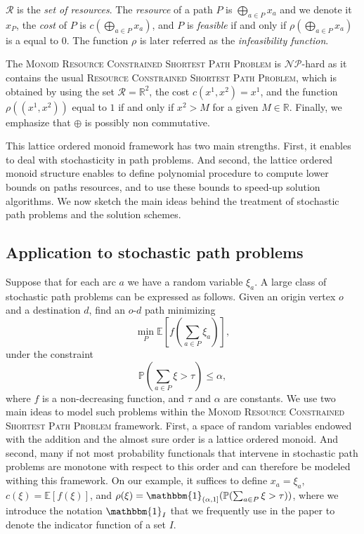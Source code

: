\documentclass[11pt]{amsart}
\theoremstyle{plain}
\theoremstyle{remark}
\def\P{\mathbb{P}}
\def\E{\mathbb{E}}
\newcommand{\ind}{\mathbbm{1}}
\newcommand{\RCSP}{\textsc{Resource Constrained Shortest Path Problem}\xspace}
\newcommand{\MRCSP}{\textsc{Monoid Resource Constrained Shortest Path Problem}\xspace}
\newcommand{\rplus}{\oplus}
\newcommand{\bigrplus}{\bigoplus}
\newcommand{\rset}{\mathcal{R}}
\newcommand{\rcost}{c}
\newcommand{\rmeas}{\rho}
\newcommand{\re}{x}
\newcommand{\NP}{$\mathcal{NP}$}
\begin{document}
$\rset$ is the \emph{set of resources}. The \emph{resource} of a path $P$ is $\bigrplus_{a \in P}x_{a}$ and we denote it $\re_{P}$, the \emph{cost} of $P$ is $\rcost\left(\bigrplus_{a \in P}x_{a}\right)$, and $P$ is \emph{feasible} if and only if $\rmeas\left(\bigrplus_{a \in P}x_{a}\right)$ is a equal to $0$. The function $\rmeas$ is later referred as the \emph{infeasibility function}. 

The \MRCSP is \NP-hard as it contains the usual \RCSP, which is obtained by using the set $\rset = \mathbb{R}^{2}$, the cost $\rcost(x^{1},x^{2}) = x^{1}$, and the function $\rmeas((x^{1},x^{2}))$ equal to $1$ if and only if $x^{2}>M$ for a given $M\in \mathbb{R}$. Finally, we emphasize that $\rplus$ is possibly non commutative. 

This lattice ordered monoid framework has two main strengths. First, it enables to deal with stochasticity in path problems. And second, the lattice ordered monoid structure enables to define polynomial procedure to compute lower bounds on paths resources, and to use these bounds to speed-up solution algorithms. We now sketch the main ideas behind the treatment of stochastic path problems and the solution schemes.



\subsection{Application to stochastic path problems} \label{sub:application_to_stochastic_path_problem}

Suppose that for each arc $a$ we have a random variable $\xi_{a}$. A large class of stochastic path problems can be expressed as follows. Given an origin vertex $o$ and a destination $d$, find an $o$-$d$ path minimizing
$$\min_{P} \E\left[f\left(\sum_{a\in P}\xi_{a}\right)\right],$$
\noindent under the constraint
$$\P\left(\sum_{a\in P}\xi > \tau\right) \leq \alpha, $$
\noindent where $f$ is a non-decreasing function, and $\tau$ and $\alpha$ are constants. We use two main ideas to model such problems within the \MRCSP framework. First, a space of random variables endowed with the addition and the almost sure order is a lattice ordered monoid. And second, many if not most probability functionals that intervene in stochastic path problems are monotone with respect to this order and can therefore be modeled withing this framework. On our example, it suffices to define $\re_{a} = \xi_{a}$, $\rcost(\xi) = \E\left[f(\xi)\right]$, and $\rmeas(\xi) = \ind_{(\alpha,1]}(\P(\sum_{a\in P}\xi > \tau) )$, where we introduce the notation $\ind_{I}$ that we frequently use in the paper to denote the indicator function of a set $I$.
\end{document}
